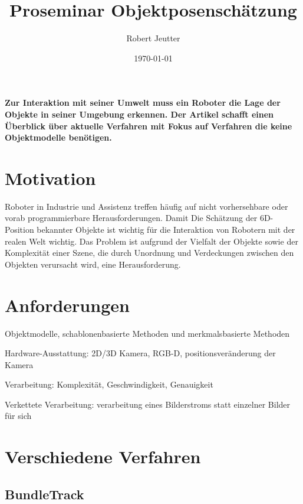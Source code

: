 \documentclass[a4paper, 11pt]{article}
\title{Proseminar Objektposenschätzung}
\author{Robert Jeutter}
\date{\today}
\begin{document}
\maketitle

\begin{multicols*}{2}
    \textbf{Zur Interaktion mit seiner Umwelt muss ein Roboter die Lage der Objekte in seiner Umgebung erkennen. Der Artikel schafft einen Überblick über aktuelle Verfahren mit Fokus auf Verfahren die keine Objektmodelle benötigen. }

    \section{Motivation}
    Roboter in Industrie und Assistenz treffen häufig auf nicht vorhersehbare oder vorab programmierbare Herausforderungen. Damit
    Die Schätzung der 6D-Position bekannter Objekte ist wichtig für die Interaktion von Robotern mit der realen Welt wichtig. Das Problem ist aufgrund der Vielfalt der Objekte sowie der Komplexität einer Szene, die durch Unordnung und Verdeckungen zwischen den Objekten verursacht wird, eine Herausforderung.

    \section{Anforderungen}
    Objektmodelle,  schablonenbasierte Methoden und merkmalsbasierte Methoden 

    Hardware-Ausstattung: 2D/3D Kamera, RGB-D, positionsveränderung der Kamera

    Verarbeitung: Komplexität, Geschwindigkeit, Genauigkeit

    Verkettete Verarbeitung: verarbeitung eines Bilderstroms statt einzelner Bilder für sich

    \section{Verschiedene Verfahren}
    \subsection{BundleTrack\cite{BundleTrack}}


\end{multicols*}
\end{document}
